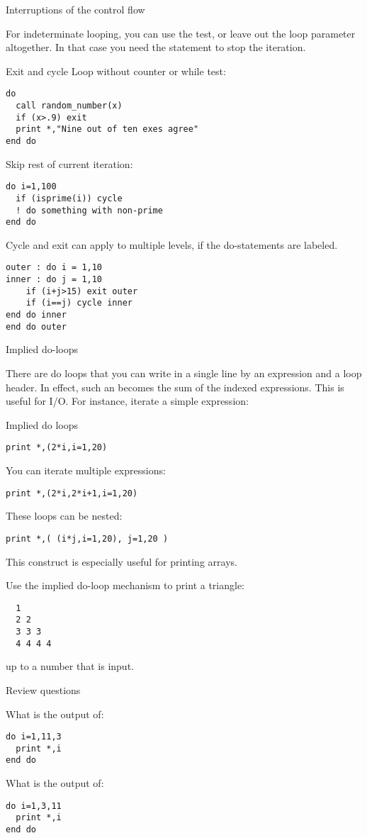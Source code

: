  {Interruptions of the control flow}

For indeterminate looping, you can use the  test,
or leave out the loop parameter altogether.
In that case you need the  statement to stop the iteration.

\begin{block}{Exit and cycle}
  \label{sl:loopexit}
  Loop without counter or while test:
\begin{lstlisting}
do
  call random_number(x)
  if (x>.9) exit
  print *,"Nine out of ten exes agree"
end do
\end{lstlisting}

Skip rest of current iteration:
\begin{lstlisting}
do i=1,100
  if (isprime(i)) cycle
  ! do something with non-prime
end do
\end{lstlisting}
\end{block}

Cycle and exit can apply to multiple levels, if the do-statements are
labeled.

\begin{lstlisting}
outer : do i = 1,10
inner : do j = 1,10
    if (i+j>15) exit outer
    if (i==j) cycle inner
end do inner
end do outer
\end{lstlisting}

 {Implied do-loops}
\label{sec:f-impdo}

There are do loops that you can write in a single line by an
expression and a loop header. In effect, such an
 becomes the sum of the indexed
expressions. This is useful
for I/O. For instance, iterate a simple expression:

\begin{block}{Implied do loops}
  \label{sl:implieddo}
\begin{lstlisting}
print *,(2*i,i=1,20)
\end{lstlisting}
You can iterate multiple expressions:
\begin{lstlisting}
print *,(2*i,2*i+1,i=1,20)
\end{lstlisting}
These loops can be nested:
\begin{lstlisting}
print *,( (i*j,i=1,20), j=1,20 )
\end{lstlisting}
\end{block}

This construct is especially useful for printing arrays.

\begin{exercise}
  \label{ex:impl-triangle}
  Use the implied do-loop mechanism to print a triangle:
\begin{lstlisting}
  1
  2 2
  3 3 3
  4 4 4 4
\end{lstlisting}
  up to a number that is input.
\end{exercise}

 {Review questions}

\begin{exercise}
  \label{ex:floop-inf}
  What is the output of:
\begin{lstlisting}
do i=1,11,3
  print *,i
end do
\end{lstlisting}
What is the output of:
\begin{lstlisting}
do i=1,3,11
  print *,i
end do
\end{lstlisting}
\end{exercise}
